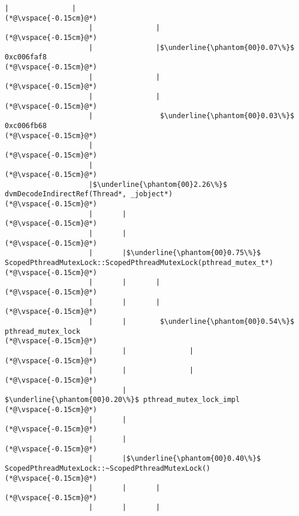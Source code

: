 \begin{lstlisting}[caption=20 viiteparametria (C$\to$Java) , label=profile:C2JBenchmark00206, numberbychapter=true, frame=lines, float, floatplacement=t]
                    |               |
(*@\vspace{-0.15cm}@*)
                    |               |
(*@\vspace{-0.15cm}@*)
                    |               |$\underline{\phantom{00}0.07\%}$ 0xc006faf8
(*@\vspace{-0.15cm}@*)
                    |               |
(*@\vspace{-0.15cm}@*)
                    |               |
(*@\vspace{-0.15cm}@*)
                    |                $\underline{\phantom{00}0.03\%}$ 0xc006fb68
(*@\vspace{-0.15cm}@*)
                    |
(*@\vspace{-0.15cm}@*)
                    |
(*@\vspace{-0.15cm}@*)
                    |$\underline{\phantom{00}2.26\%}$ dvmDecodeIndirectRef(Thread*, _jobject*)
(*@\vspace{-0.15cm}@*)
                    |       |
(*@\vspace{-0.15cm}@*)
                    |       |
(*@\vspace{-0.15cm}@*)
                    |       |$\underline{\phantom{00}0.75\%}$ ScopedPthreadMutexLock::ScopedPthreadMutexLock(pthread_mutex_t*)
(*@\vspace{-0.15cm}@*)
                    |       |       |
(*@\vspace{-0.15cm}@*)
                    |       |       |
(*@\vspace{-0.15cm}@*)
                    |       |        $\underline{\phantom{00}0.54\%}$ pthread_mutex_lock
(*@\vspace{-0.15cm}@*)
                    |       |               |
(*@\vspace{-0.15cm}@*)
                    |       |               |
(*@\vspace{-0.15cm}@*)
                    |       |                $\underline{\phantom{00}0.20\%}$ pthread_mutex_lock_impl
(*@\vspace{-0.15cm}@*)
                    |       |
(*@\vspace{-0.15cm}@*)
                    |       |
(*@\vspace{-0.15cm}@*)
                    |       |$\underline{\phantom{00}0.40\%}$ ScopedPthreadMutexLock::~ScopedPthreadMutexLock()
(*@\vspace{-0.15cm}@*)
                    |       |       |
(*@\vspace{-0.15cm}@*)
                    |       |       |

\end{lstlisting}
